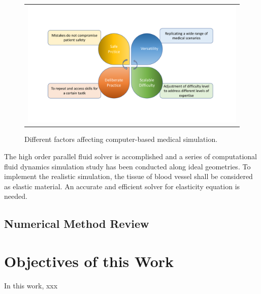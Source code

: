\begin{figure}[H]
	\centering
	\begin{tabular}{c}
		\includegraphics[width=1.0\textwidth]{./pics/computer_simulation}
	\end{tabular}
	\caption{\footnotesize Different factors affecting computer-based medical simulation.} \label{fig: ch1f1}
\end{figure}

The high order parallel fluid solver \cite{liang2007large, liang2007large, liang2009effect} is accomplished and a series of computational fluid dynamics simulation study has been conducted along ideal geometries. To implement the realistic simulation, the tissue of blood vessel shall be considered as elastic material. An accurate and efficient solver for elasticity equation is needed.

\subsection{Numerical Method Review}



\section{Objectives of this Work}
In this work, xxx
